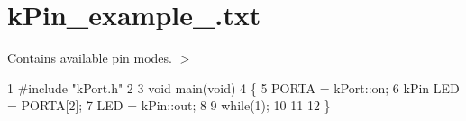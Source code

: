 \hypertarget{kPin_example_1_8txt-example}{}\section{k\+Pin\+\_\+example\+\_.\+txt}
Contains available pin modes. $>$


\begin{DoxyCodeInclude}
1 #include "kPort.h"
2 
3 void main(void)
4 \{
5     PORTA = kPort::on;
6     kPin LED = PORTA[2];
7     LED = kPin::out;
8 
9     while(1);
10 
11 
12 \}
\end{DoxyCodeInclude}
 